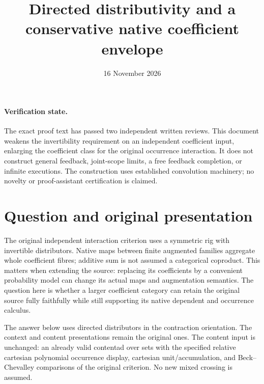 \documentclass[11pt]{article}
\title{Directed distributivity and a conservative native coefficient envelope}
\date{16 November 2026}
\begin{document}
\maketitle
\paragraph{Verification state.} The exact proof text has passed two independent written reviews. This document weakens the invertibility requirement on an independent coefficient input, enlarging the coefficient class for the original occurrence interaction. It does not construct general feedback, joint-scope limits, a free feedback completion, or infinite executions. The construction uses established convolution machinery; no novelty or proof-assistant certification is claimed.

\section{Question and original presentation}
The original independent interaction criterion uses a symmetric rig with invertible distributors. Native maps between finite augmented families aggregate whole coefficient fibres; additive sum is not assumed a categorical coproduct. This matters when extending the source: replacing its coefficients by a convenient probability model can change its actual maps and augmentation semantics. The question here is whether a larger coefficient category can retain the original source fully faithfully while still supporting its native dependent and occurrence calculus.

The answer below uses directed distributors in the contraction orientation. The context and content presentations remain the original ones. The content input is unchanged: an already valid contentad over sets with the specified relative cartesian polynomial occurrence display, cartesian unit/accumulation, and Beck--Chevalley comparisons of the original criterion. No new mixed crossing is assumed.
\end{document}
